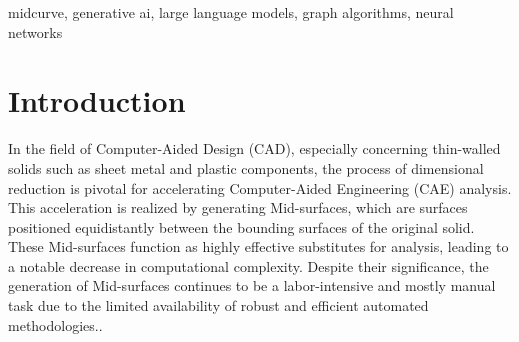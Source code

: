 \documentclass[10pt, conference]{IEEEtran}
\begin{document}



\begin{IEEEkeywords}
midcurve, generative ai, large language models, graph algorithms, neural networks
\end{IEEEkeywords}

\section{Introduction}
\label{sec:1}
In the field of Computer-Aided Design (CAD), especially concerning thin-walled solids such as sheet metal and plastic components, the process of dimensional reduction is pivotal for accelerating Computer-Aided Engineering (CAE) analysis. This acceleration is realized by generating Mid-surfaces, which are surfaces positioned equidistantly between the bounding surfaces of the original solid. These Mid-surfaces function as highly effective substitutes for analysis, leading to a notable decrease in computational complexity. Despite their significance, the generation of Mid-surfaces continues to be a labor-intensive and mostly manual task due to the limited availability of robust and efficient automated methodologies.\cite{medial2010}.
\end{document}
